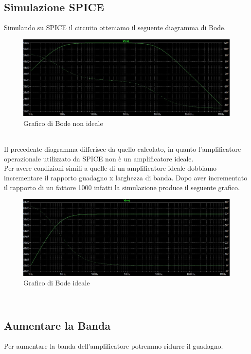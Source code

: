 \subsection{Simulazione SPICE}\label{subsec:simulazione_spice}
Simulando su SPICE il circuito otteniamo il seguente diagramma di Bode.\\
\begin{figure}[h]
    \centering
    \includegraphics[width=1\textwidth]{Figure/Bode 1.4_1.jpg}
    \caption{Grafico di Bode non ideale}
    \label{fig:bode_non_ideale}
\end{figure}\\
Il precedente diagramma differisce da quello calcolato, in quanto l'amplificatore operazionale utilizzato da SPICE non è un amplificatore ideale.\\
Per avere condizioni simili a quelle di un amplificatore ideale dobbiamo incrementare il rapporto guadagno x larghezza di banda. Dopo aver incrementato il rapporto di un fattore 1000 infatti la simulazione produce il seguente grafico.\\
\begin{figure}[h]
    \centering
    \includegraphics[width=1\textwidth]{Figure/Bode 1.4_2.jpg}
    \caption{Grafico di Bode ideale}
    \label{fig:bode_ideale}
\end{figure}\\

\subsection{Aumentare la Banda}\label{subsec:aumentare_banda}
Per aumentare la banda dell'amplificatore potremmo ridurre il guadagno.

